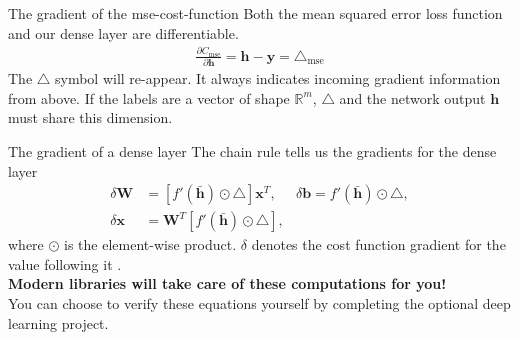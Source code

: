 \documentclass[notes]{beamer}
\begin{document}
    \begin{frame}{The gradient of the mse-cost-function}
      Both the mean squared error loss function and our dense layer are differentiable. 
      \begin{align}
        \frac{\partial C_{\text{mse}}}{\partial \mathbf{h}} = \mathbf{h} - \mathbf{y} = \triangle_{\text{mse}}
      \end{align}
      The $\triangle$ symbol will re-appear. It always indicates incoming gradient information from above.
      If the labels are a vector of shape $\mathbb{R}^m$, $\triangle$ and the network output $\mathbf{h}$ must share 
      this dimension.
    \end{frame}

    \begin{frame}{The gradient of a dense layer}
      The chain rule tells us the gradients for the dense layer~\cite{nielsen2015neural}
      \begin{align}
        \delta \mathbf{W} &= [f'(\bar{\mathbf{h}}) \odot \triangle]\mathbf{x}^T, &  \delta \mathbf{b} = f'(\bar{\mathbf{h}}) \odot \triangle, \\
        \delta \mathbf{x} &= \mathbf{W}^T [f'(\bar{\mathbf{h}}) \odot \triangle],
      \end{align}
      where $\odot$ is the element-wise product. $\delta$ denotes the cost function gradient for the value following it \cite{greff2016lstm}. \\
      \textbf{Modern libraries will take care of these computations for you!} \\
      You can choose to verify these equations yourself by completing the optional deep learning project.
    \end{frame}
\end{document}
